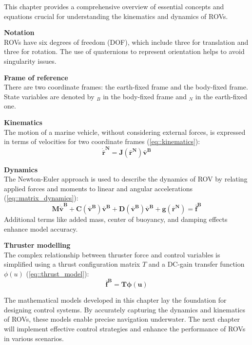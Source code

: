 This chapter provides a comprehensive overview of essential 
concepts and equations crucial for understanding the kinematics and dynamics of ROVs.

\textbf{Notation} \\
ROVs have six degrees of freedom (DOF), which include three for translation and three for rotation.
The use of quaternions to represent orientation helps to avoid singularity issues.

\textbf{Frame of reference} \\
There are two coordinate frames: the earth-fixed frame and the body-fixed frame. 
State variables are denoted by $_B$ in the body-fixed frame and $_N$ in the earth-fixed one.

\textbf{Kinematics} \\
The motion of a marine vehicle, without considering external forces, 
is expressed in terms of velocities for two coordinate frames (\ref{eq::kinematics}):
$$
\mathbf{\dot{\bar{r}}^N=J(\bar{r}^N) \bar{v}^B}
$$

\textbf{Dynamics} \\
The Newton-Euler approach is used to describe the dynamics of ROV by relating applied 
forces and moments to linear and angular accelerations (\ref{eq::matrix_dynamics}):
$$
\mathbf{M \dot{\bar{v}}^B + C(\bar{v}^B) \bar{v}^B+D(\bar{v}^B) 
\bar{v}^B+g(\bar{r}^N)= \bar{f}^B}
$$
Additional terms like added mass, center of buoyancy, and damping effects enhance model accuracy.

\textbf{Thruster modelling} \\
The complex relationship between thruster force and control variables 
is simplified using a thrust configuration matrix $T$ and a DC-gain transfer 
function $\phi(u)$ (\ref{eq::thrust_model}):
$$
\mathbf{\bar{f}^B=T\boldsymbol{\phi}(u)}
$$

The mathematical models developed in this chapter lay the foundation for designing control systems. 
By accurately capturing the dynamics and kinematics of ROVs, these models enable precise navigation 
underwater. The next chapter will implement effective control strategies and enhance the 
performance of ROVs in various scenarios.
